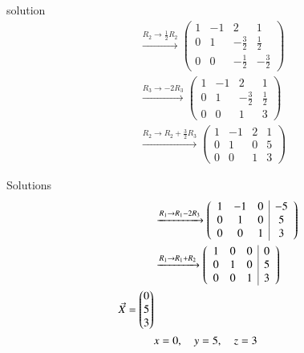 \documentclass{beamer}
\begin{document}
\begin{frame}{solution}
\begin{align}
&\xrightarrow{R_2 \to \frac{1}{2} R_2}
\left(
\begin{array}{ccc|c}
1 & -1 & 2 & 1 \\
0 & 1 & -\frac{3}{2} & \frac{1}{2} \\
0 & 0 & -\frac{1}{2} & -\frac{3}{2}
\end{array}
\right) \\
&\xrightarrow{R_3 \to -2 R_3}
\left(
\begin{array}{ccc|c}
1 & -1 & 2 & 1 \\
0 & 1 & -\frac{3}{2} & \frac{1}{2} \\
0 & 0 & 1 & 3
\end{array}
\right) \\
&\xrightarrow{R_2 \to R_2 + \frac{3}{2} R_3}
\left(
\begin{array}{ccc|c}
1 & -1 & 2 & 1 \\
0 & 1 & 0 & 5 \\
0 & 0 & 1 & 3
\end{array}
\right) 
\end{align}
\end{frame}
\begin{frame}{Solutions}
\begin{align}
 &\xrightarrow{R_1 \to R_1 - 2 R_3}
\left(
\begin{array}{ccc|c}
1 & -1 & 0 & -5 \\
0 & 1 & 0 & 5 \\
0 & 0 & 1 & 3
\end{array}
\right) \\
&\xrightarrow{R_1 \to R_1 + R_2}
\left(
\begin{array}{ccc|c}
1 & 0 & 0 & 0 \\
0 & 1 & 0 & 5 \\
0 & 0 & 1 & 3
\end{array}
\right) \\
  \Vec{X}=\begin{pmatrix}0
                    \\
                     5
                    \\
                     3\end{pmatrix}\\
&x = 0, \quad y = 5, \quad z = 3
\end{align}
\end{frame}
\end{document}

